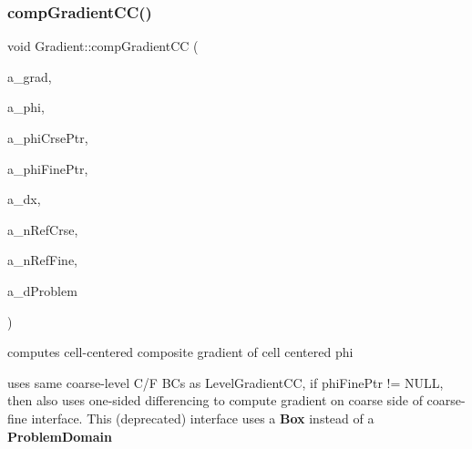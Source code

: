 \subsubsection{\texorpdfstring{comp\+Gradient\+C\+C()}{compGradientCC()}\hspace{0.1cm}{\footnotesize\ttfamily [2/6]}}
{\footnotesize\ttfamily void Gradient\+::comp\+Gradient\+CC (\begin{DoxyParamCaption}\item[{\textbf{ Level\+Data}$<$ \textbf{ F\+Array\+Box} $>$ \&}]{a\+\_\+grad,  }\item[{\textbf{ Level\+Data}$<$ \textbf{ F\+Array\+Box} $>$ \&}]{a\+\_\+phi,  }\item[{const \textbf{ Level\+Data}$<$ \textbf{ F\+Array\+Box} $>$ $\ast$}]{a\+\_\+phi\+Crse\+Ptr,  }\item[{const \textbf{ Level\+Data}$<$ \textbf{ F\+Array\+Box} $>$ $\ast$}]{a\+\_\+phi\+Fine\+Ptr,  }\item[{const \textbf{ Real}}]{a\+\_\+dx,  }\item[{const int}]{a\+\_\+n\+Ref\+Crse,  }\item[{const int}]{a\+\_\+n\+Ref\+Fine,  }\item[{const \textbf{ Box} \&}]{a\+\_\+d\+Problem }\end{DoxyParamCaption})\hspace{0.3cm}{\ttfamily [static]}}



computes cell-\/centered composite gradient of cell centered phi 

uses same coarse-\/level C/F BC\textquotesingle{}s as Level\+Gradient\+CC, if phi\+Fine\+Ptr != N\+U\+LL, then also uses one-\/sided differencing to compute gradient on coarse side of coarse-\/fine interface. This (deprecated) interface uses a \textbf{ Box} instead of a \textbf{ Problem\+Domain} \mbox{\label{class_gradient_a029f7d1cb39888c2e12b9fb016b58928}} 
